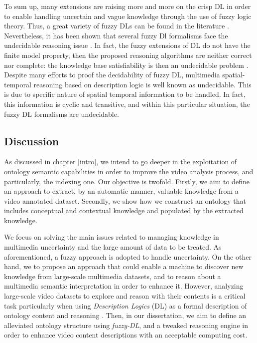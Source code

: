 		To sum up, many extensions are raising more and more on the crisp DL in order to enable 
		handling uncertain and vague knowledge through the use of fuzzy logic theory. Thus, 
		a great variety of fuzzy DLs can be found in the literature \citep{Garci2010,Cerami2013}. 
		Nevertheless, it has been shown that several fuzzy Dl formalisms face the undecidable 
		reasoning issue \citep{Baader2011}. In fact, the fuzzy extensions of DL {do} not have 
		the finite model property, then the proposed reasoning algorithms are neither correct nor 
		complete: the knowledge base satisfiability is then an undecidable problem \citep{Cerami2013}. 
		Despite many efforts to proof the decidability of fuzzy DL, multimedia spatial-temporal 
		reasoning based on description logic is well known as undecidable. This is due to specific 
		nature of spatial temporal information to be handled. In fact, this information is 
		cyclic and transitive, and within this particular situation, the fuzzy DL formalisms are undecidable.


		\subsection{Discussion}

		As discussed in chapter \ref{intro}, we intend to go deeper in the exploitation of ontology
		semantic capabilities in order to improve the video analysis process, and particularly, 
		the indexing one. Our objective is twofold. Firstly, we aim to define an approach to extract, 
		by an automatic manner, valuable knowledge from a video annotated dataset. Secondly, 
		we show how we construct an ontology that includes conceptual and contextual knowledge 
		and populated by the extracted knowledge. 

		We focus on solving the main issues related to managing knowledge in multimedia  
		uncertainty and the large amount of data to be treated. As aforementioned, a fuzzy approach 
		is adopted to handle uncertainty. On the other hand, we  to propose an approach that 
		could enable a machine to discover new knowledge from large-scale multimedia datasets, and 
		to reason about a multimedia semantic interpretation in order to enhance it.  However, 
		analyzing large-scale video datasets to explore and reason with their contents is a critical
		task particularly when using \emph{Description Logics} (DL) as a formal description of ontology 
		content and reasoning \citep{Stoilos2005,Dasiopoulou2010,Bannour2014}. Then, in our dissertation, 
		we aim to define an alleviated ontology structure using \emph{fuzzy-DL}, and a tweaked reasoning 
		engine in order to enhance video content descriptions with an acceptable computing cost. 



